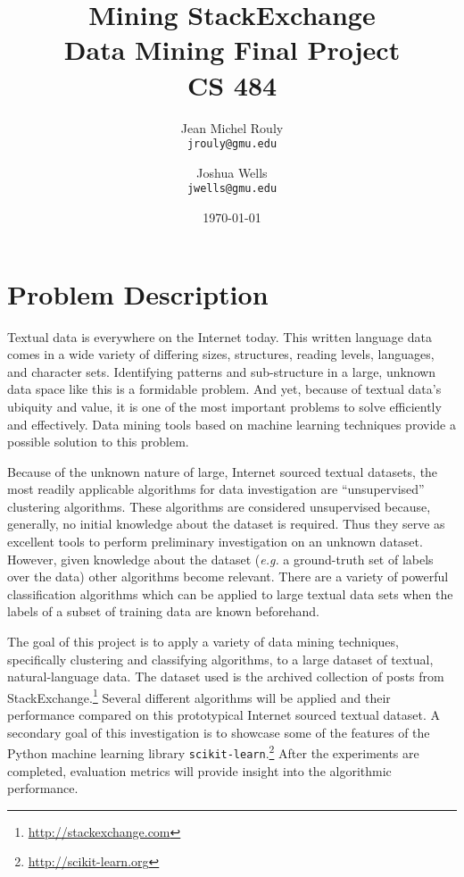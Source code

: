 \documentclass[letterpaper,12pt]{article}
\title{
  \Huge\textbf{Mining StackExchange} \\
  \LARGE Data Mining Final Project \\
  CS 484 \\
}
\author{
  Jean Michel Rouly\\
  \texttt{jrouly@gmu.edu}
  \and
  Joshua Wells\\
  \texttt{jwells@gmu.edu}
}
\date{\today}
\begin{document}
\maketitle


  \section{Problem Description}

  Textual data is everywhere on the Internet today. This written language
  data comes in a wide variety of differing sizes, structures, reading
  levels, languages, and character sets. Identifying patterns and
  sub-structure in a large, unknown data space like this is a formidable
  problem. And yet, because of textual data's ubiquity and value, it is one
  of the most important problems to solve efficiently and effectively. Data
  mining tools based on machine learning techniques provide a possible
  solution to this problem.

  Because of the unknown nature of large, Internet sourced textual
  datasets, the most readily applicable algorithms for data investigation
  are ``unsupervised'' clustering algorithms. These algorithms are
  considered unsupervised because, generally, no initial knowledge about
  the dataset is required. Thus they serve as excellent tools to perform
  preliminary investigation on an unknown dataset. However, given knowledge
  about the dataset (\textit{e.g.} a ground-truth set of labels over the
  data) other algorithms become relevant. There are a variety of powerful
  classification algorithms which can be applied to large textual data sets
  when the labels of a subset of training data are known beforehand.

  The goal of this project is to apply a variety of data mining techniques,
  specifically clustering and classifying algorithms, to a large dataset of
  textual, natural-language data. The dataset used is the archived
  collection of posts from
  StackExchange.\footnote{\url{http://stackexchange.com}} Several different
  algorithms will be applied and their performance compared on this
  prototypical Internet sourced textual dataset. A secondary goal of this
  investigation is to showcase some of the features of the Python machine
  learning library
  \texttt{scikit-learn}.\footnote{\url{http://scikit-learn.org}} After the
  experiments are completed, evaluation metrics will provide insight into
  the algorithmic performance.


\end{document}
